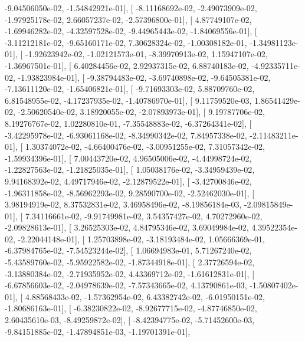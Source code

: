 \documentclass{article}
\begin{document}
         -9.04506050e-02,  -1.54842921e-01],
       [ -8.11168692e-02,  -2.49073909e-02,  -1.97925178e-02,
          2.66057237e-02,  -2.57396800e-01],
       [  4.87749107e-02,  -1.69946282e-02,  -4.32597528e-02,
         -9.44965443e-02,  -1.84069556e-01],
       [ -3.11212181e-02,  -9.65160171e-02,   7.30628324e-02,
         -1.00308182e-01,  -1.34981123e-01],
       [ -1.92623942e-02,  -1.02121573e-01,  -8.39970913e-02,
          1.15947107e-02,  -1.36967501e-01],
       [  6.40284456e-02,   2.92937315e-02,   6.88740183e-02,
         -4.92335711e-02,  -1.93823984e-01],
       [ -9.38794483e-02,  -3.69740898e-02,  -9.64505381e-02,
         -7.13611120e-02,  -1.65406821e-01],
       [ -9.71693303e-02,   5.88709760e-02,   6.81548955e-02,
         -4.17237935e-02,  -1.40786970e-01],
       [  9.11759520e-03,   1.86541429e-02,  -2.50620540e-02,
          3.18920055e-02,  -2.07893973e-01],
       [  9.19787706e-02,   8.19276767e-02,   1.02280810e-01,
         -7.35548883e-02,  -6.37264341e-02],
       [ -3.42295978e-02,  -6.93061168e-02,  -8.34990342e-02,
          7.84957338e-02,  -2.11483211e-01],
       [  1.30374072e-02,  -4.66400476e-02,  -3.00951255e-02,
          7.31057342e-02,  -1.59934396e-01],
       [  7.00443720e-02,   4.96505006e-02,  -4.44998724e-02,
         -1.22827563e-02,  -1.21825035e-01],
       [  1.05038176e-02,  -3.34959439e-02,   9.94168392e-02,
          4.49717946e-02,  -2.12879522e-01],
       [ -3.42700846e-02,  -1.96311858e-02,  -8.56962293e-02,
          9.28590700e-02,  -2.52462030e-01],
       [  3.98194919e-02,   8.37532831e-02,   3.46958496e-02,
         -8.19856184e-03,  -2.09815849e-01],
       [  7.34116661e-02,  -9.91749981e-02,   3.54357427e-02,
          4.70272960e-02,  -2.09828613e-01],
       [  3.26525303e-02,   4.84795346e-02,   3.69049984e-02,
          4.39522354e-02,  -2.22044148e-01],
       [  1.25703898e-02,  -3.18193484e-02,   1.05666369e-01,
         -6.37984765e-02,  -7.54523244e-02],
       [  1.06694983e-01,   5.71267240e-02,  -5.43589760e-02,
         -5.95922582e-02,  -1.87344918e-01],
       [  2.37726594e-02,  -3.13880384e-02,  -2.71935952e-02,
          4.43369712e-02,  -1.61612831e-01],
       [ -6.67856603e-02,  -2.04978639e-02,  -7.57343665e-02,
          4.13790861e-03,  -1.50807402e-01],
       [  4.88568433e-02,  -1.57362954e-02,   6.43382742e-02,
         -6.01950151e-02,  -1.80686163e-01],
       [ -6.38230822e-02,  -8.92677715e-02,  -4.87746850e-02,
          2.60435610e-03,  -8.49259872e-02],
       [ -8.42394775e-02,  -5.71452600e-03,  -9.84151885e-02,
         -1.47894851e-03,  -1.19701391e-01],
\end{document}
